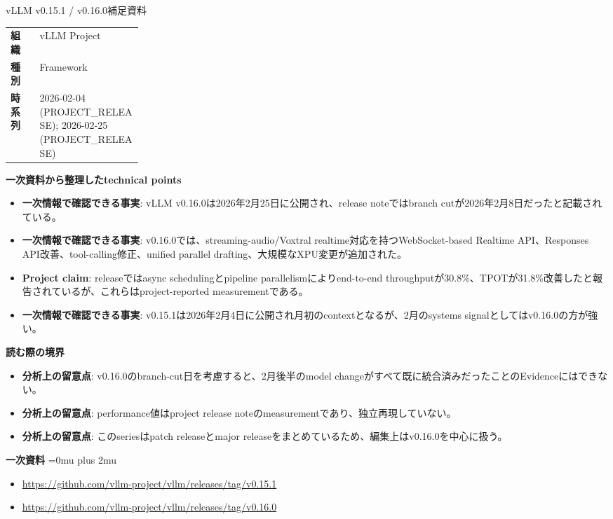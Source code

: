 \begin{technicalnote}{vLLM v0.15.1 / v0.16.0}{補足資料}
\begingroup
\begin{tabularx}{\linewidth}{@{}>{\bfseries}p{0.22\linewidth}X@{}}
組織 & vLLM Project \\
種別 & Framework \\
時系列 & 2026-02-04 (PROJECT\_RELEASE); 2026-02-25 (PROJECT\_RELEASE) \\
\end{tabularx}
\smallskip
{\bfseries 一次資料から整理したtechnical points}
\begin{itemize}[leftmargin=1.5em,itemsep=0.35em]
\item \textbf{一次情報で確認できる事実}: vLLM v0.16.0は2026年2月25日に公開され、release noteではbranch cutが2026年2月8日だったと記載されている。
\item \textbf{一次情報で確認できる事実}: v0.16.0では、streaming-audio/Voxtral realtime対応を持つWebSocket-based Realtime API、Responses API改善、tool-calling修正、unified parallel drafting、大規模なXPU変更が追加された。
\item \textbf{Project claim}: releaseではasync schedulingとpipeline parallelismによりend-to-end throughputが30.8\%、TPOTが31.8\%改善したと報告されているが、これらはproject-reported measurementである。
\item \textbf{一次情報で確認できる事実}: v0.15.1は2026年2月4日に公開され月初のcontextとなるが、2月のsystems signalとしてはv0.16.0の方が強い。
\end{itemize}
\begin{minipage}{\linewidth}
{\bfseries 読む際の境界}
\begin{itemize}[leftmargin=1.5em,itemsep=0.35em]
\item \textbf{分析上の留意点}: v0.16.0のbranch-cut日を考慮すると、2月後半のmodel changeがすべて既に統合済みだったことのEvidenceにはできない。
\item \textbf{分析上の留意点}: performance値はproject release noteのmeasurementであり、独立再現していない。
\item \textbf{分析上の留意点}: このseriesはpatch releaseとmajor releaseをまとめているため、編集上はv0.16.0を中心に扱う。
\end{itemize}
\begin{samepage}
{\bfseries 一次資料}
\begingroup\sloppy
\Urlmuskip=0mu plus 2mu\relax
\begin{itemize}[leftmargin=1.5em,itemsep=0.25em]
\item {\scriptsize\url{https://github.com/vllm-project/vllm/releases/tag/v0.15.1}}
\item {\scriptsize\url{https://github.com/vllm-project/vllm/releases/tag/v0.16.0}}
\end{itemize}
\endgroup
\end{samepage}
\end{minipage}
\endgroup
\end{technicalnote}
\medskip

